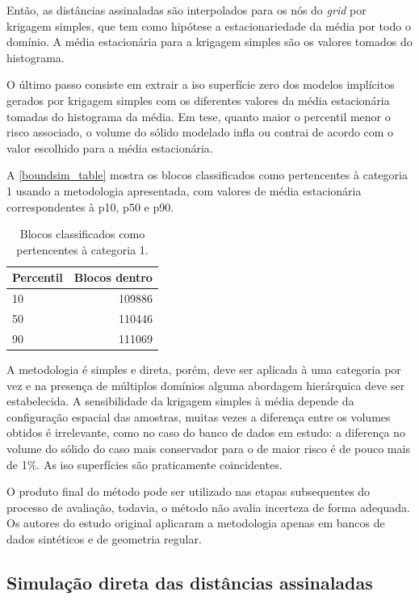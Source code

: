 Então, as distâncias assinaladas são interpolados para os nós do \textit{grid} por krigagem simples, que tem como hipótese a estacionariedade da média por todo o domínio. A média estacionária para a krigagem simples são os valores tomados do histograma.

O último passo consiste em extrair a iso superfície zero dos modelos implícitos gerados por krigagem simples com os diferentes valores da média estacionária tomadas do histograma da média. Em tese, quanto maior o percentil menor o risco associado, o volume do sólido modelado infla ou contrai de acordo com o valor escolhido para a média estacionária.

A \autoref{boundsim_table} mostra os blocos classificados como pertencentes à categoria 1 usando a metodologia apresentada, com valores de média estacionária correspondentes à p10, p50 e p90.

\begin{table}[H]
\begin{center}
\begin{tabular}{lr}
Percentil & \multicolumn{1}{l}{Blocos dentro} \\ \hline
10 & 109886 \\
50 & 110446 \\
90 & 111069 \\ \hline
\end{tabular}
\end{center}
\caption{Blocos classificados como pertencentes à categoria 1.}\label{boundsim_table}
\end{table}

A metodologia é simples e direta, porém, deve ser aplicada à uma categoria por vez e na presença de múltiplos domínios alguma abordagem hierárquica deve ser estabelecida. A sensibilidade da krigagem simples à média depende da configuração espacial das amostras, muitas vezes a diferença entre os volumes obtidos é irrelevante, como no caso do banco de dados em estudo: a diferença no volume do sólido do caso mais conservador para o de maior risco é de pouco mais de 1\%. As iso superfícies são praticamente coincidentes.

O produto final do método pode ser utilizado nas etapas subsequentes do processo de avaliação, todavia, o método não avalia incerteza de forma adequada. Os autores do estudo original aplicaram a metodologia apenas em bancos de dados sintéticos e de geometria regular. 

\subsection{Simulação direta das distâncias assinaladas}\label{sim_direta}

